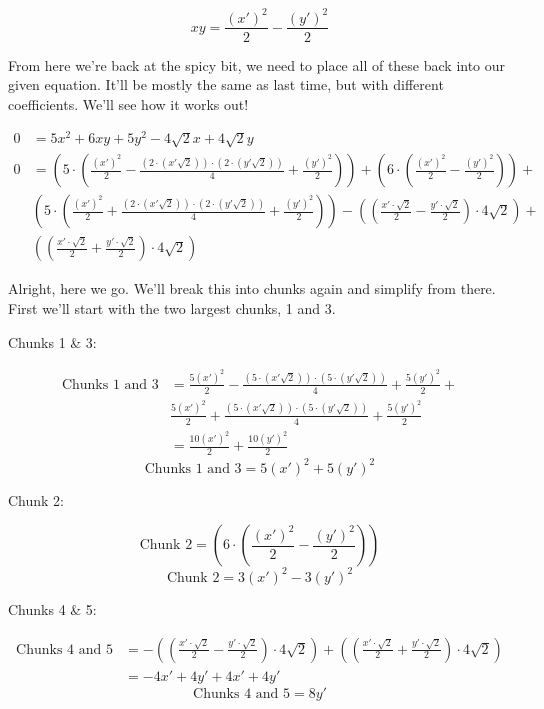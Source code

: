 \begin{solution}[Solution]
    \[\boxed{xy = \frac{(x')^2}{2} - \frac{(y')^2}{2}}\]
    
    From here we're back at the spicy bit, we need to place all of these back into our given equation. It'll be mostly the same as last time, but with different coefficients. We'll see how it works out! 
    
    \begin{align}
        0 &= 5x^2 + 6xy + 5y^2 - 4\sqrt{2}x + 4\sqrt{2}y \\
        0 &= \left( 5 \cdot \left( \frac{(x')^2}{2} - \frac{(2\cdot (x' \sqrt{2})) \cdot (2 \cdot (y' \sqrt{2}))}{4} + \frac{(y')^2}{2} \right) \right) + \left( 6 \cdot \left( \frac{(x')^2}{2} - \frac{(y')^2}{2} \right) \right) + \\ 
        & \left( 5 \cdot \left( \frac{(x')^2}{2} + \frac{(2\cdot (x' \sqrt{2})) \cdot (2 \cdot (y' \sqrt{2}))}{4} + \frac{(y')^2}{2} \right) \right) - \left( \left( \frac{x' \cdot \sqrt{2}}{2} - \frac{y' \cdot \sqrt{2}}{2} \right) \cdot 4\sqrt{2} \right) + \\
        & \left( \left( \frac{x' \cdot \sqrt{2}}{2} + \frac{y' \cdot \sqrt{2}}{2} \right) \cdot 4\sqrt{2} \right) 
    \end{align}
    
    Alright, here we go. We'll break this into chunks again and simplify from there. First we'll start with the two largest chunks, 1 and 3. \medskip
    
    Chunks 1 \& 3:
    
    \begin{align}
        \text{Chunks 1 and 3} &= \frac{5(x')^2}{2} - \frac{(5\cdot (x' \sqrt{2})) \cdot (5 \cdot (y' \sqrt{2}))}{4} + \frac{5(y')^2}{2}  + \\
        & \frac{5(x')^2}{2} + \frac{(5\cdot (x' \sqrt{2})) \cdot (5 \cdot (y' \sqrt{2}))}{4} + \frac{5(y')^2}{2} \\
        &= \frac{10(x')^2}{2} + \frac{10(y')^2}{2}
    \end{align}
    \[\boxed{\text{Chunks 1 and 3} = 5(x')^2 + 5(y')^2}\]
    
    Chunk 2:
    
    \[\text{Chunk 2} = \left( 6 \cdot \left( \frac{(x')^2}{2} - \frac{(y')^2}{2} \right) \right)\]
    \[\boxed{\text{Chunk 2} = 3(x')^2 - 3(y')^2}\]
    
    Chunks 4 \& 5:

    \begin{align}
        \text{Chunks 4 and 5} &= -\left( \left( \frac{x' \cdot \sqrt{2}}{2} - \frac{y' \cdot \sqrt{2}}{2} \right) \cdot 4\sqrt{2} \right) + \left( \left( \frac{x' \cdot \sqrt{2}}{2} + \frac{y' \cdot \sqrt{2}}{2} \right) \cdot 4\sqrt{2} \right) \\
        &= -4x' + 4y' + 4x' + 4y'
    \end{align}
    \[\boxed{ \text{Chunks 4 and 5} = 8y'  }\]
    

\end{solution}
